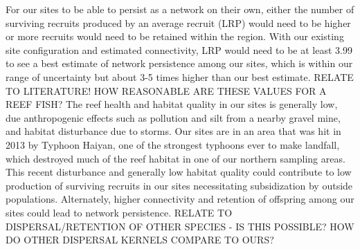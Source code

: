 \documentclass[12pt, oneside]{article}   	%
\begin{document}

For our sites to be able to persist as a network on their own, either the number of surviving recruits produced by an average recruit (LRP) would need to be higher or more recruits would need to be retained within the region. With our existing site configuration and estimated connectivity, LRP would need to be at least 3.99 to see a best estimate of network persistence among our sites, which is within our range of uncertainty but about 3-5 times higher than our best estimate. RELATE TO LITERATURE! HOW REASONABLE ARE THESE VALUES FOR A REEF FISH? The reef health and habitat quality in our sites is generally low, due anthropogenic effects such as pollution and silt from a nearby gravel mine, and habitat disturbance due to storms. Our sites are in an area that was hit in 2013 by Typhoon Haiyan, one of the strongest typhoons ever to make landfall, which destroyed much of the reef habitat in one of our northern sampling areas. This recent disturbance and generally low habitat quality could contribute to low production of surviving recruits in our sites \citep[seen in other populations with low habitat quality, e.g.][]{hayashi2019low} necessitating subsidization by outside populations. Alternately, higher connectivity and retention of offspring among our sites could lead to network persistence. RELATE TO DISPERSAL/RETENTION OF OTHER SPECIES - IS THIS POSSIBLE? HOW DO OTHER DISPERSAL KERNELS COMPARE TO OURS?
\end{document}
